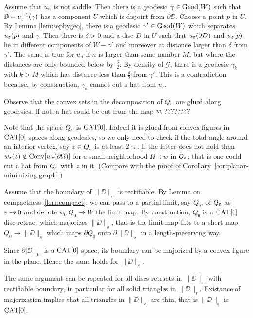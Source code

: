 \documentclass[a4paper,10pt]{amsart}
\begin{document}
Assume that $u_\varepsilon$ is not saddle. Then there is a geodesic $\gamma\in\mathop{\rm Geod}\nolimits(W)$ such that $\mathbb{D}-u_\varepsilon^{-1}(\gamma)$
has a component $U$ which is disjoint from $\partial \DD$. Choose a point $p$ in $U$. By Lemma \ref{lem:sepbygeo}, there is  
a geodesic $\gamma'\in\mathop{\rm Geod}\nolimits(W)$ which separates $u_\varepsilon(p)$ and $\gamma$.
Then there is $\delta>0$ and a disc $D$ in $U$ such that
$u_\varepsilon(\partial D)$ and $u_\varepsilon(p)$ lie in different components of $W-\gamma'$ and moreover at distance larger than $\delta$ from $\gamma'$.
The same is true for $u_n$ if $n$ is larger than some number $M$, but where the distances are only bounded below by $\frac{\delta}{2}$.
By density of $\mathcal{G}$, there is a geodesic $\gamma_k$ with $k>M$ which has distance less than $\frac{\delta}{2}$ from $\gamma'$. 
This is a contradiction because, by construction, $\gamma_k$ cannot cut a hat from $u_k$.
\qeds

Observe that the convex sets in the decomposition of $Q_\varepsilon$ are glued along geodesics.
If not, a hat could be cut from the map $w_\varepsilon$????????

Note that the space $Q_\varepsilon$ is $\mathop{\rm CAT}\nolimits[0]$. 
Indeed it is glued from convex figures in $\mathop{\rm CAT}\nolimits[0]$ spaces along geodesics,
so we only need to check if the total angle around an interior vertex, say $z\in Q_\varepsilon$ is at least $2\cdot\pi$.
If the latter does not hold then 
$w_\varepsilon(z)\notin\mathop{\rm Conv}\nolimits [w_\varepsilon (\partial\Omega)]$
for a small neighborhood $\Omega\ni w$ in $Q_\varepsilon$;
that is one could cut a hat from $Q_\varepsilon$ with $z$ in it.
(Compare with the proof of Corollary~\ref{cor:planar-minimizing-graph}.)

Assume that the boundary of $\|\DD\|_s$ is rectifiable.
By Lemma on compactness~\ref{lem:compact},
we can pass to a partial limit, say $Q_0$, of $Q_\varepsilon$ as $\varepsilon\to 0$ and denote $w_0\:Q_0\to W$ the limit map.
By construction, $Q_0$ is a $\mathop{\rm CAT}\nolimits[0]$ disc retract which majorizes $\|\DD\|_s$,
that is the limit map lifts to a short map $Q_0\to \|\DD\|_s$ which maps $\partial Q_0$ onto  $\partial \|\DD\|_s$ in a length-preserving way.

Since $\partial |\DD\|_0$ is a $\mathop{\rm CAT}\nolimits[0]$ space, its boundary can be majorized by a convex figure in the plane.
Hence the same holds for $\|\DD\|_s$.

The same argument can be repeated for all discs retracts in $\|\DD\|_s$ with rectifiable boundary, in particular for all solid triangles in $\|\DD\|_s$.
Existance of majorization implies that all triangles in $\|\DD\|_s$ are thin, that is $\|\DD\|_s$ is $\mathop{\rm CAT}\nolimits[0]$.
\qeds
\end{document}
